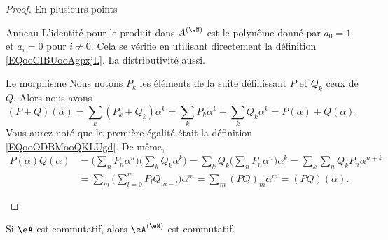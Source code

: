 \begin{proof}
    En plusieurs points
    \begin{subproof}
        \item[Anneau]
            L'identité pour le produit dans \( A^{(\eN)}\) est le polynôme donné par \( a_0=1\) et \( a_i=0\) pour \( i\neq 0\). Cela se vérifie en utilisant directement la définition \eqref{EQooCIBUooAgpxjL}. La distributivité aussi.
        \item[Le morphisme]
    Nous notons \( P_k\) les éléments de la suite définissant \( P\) et \( Q_k\) ceux de \( Q\). Alors nous avons
    \begin{equation}
        (P+Q)(\alpha)=\sum_k(P_k+Q_k)\alpha^k=\sum_kP_k\alpha^k+\sum_kQ_k\alpha^k=P(\alpha)+Q(\alpha).
    \end{equation}
    Vous aurez noté que la première égalité était la définition \eqref{EQooODBMooQKLUgd}. De même,
    \begin{subequations}
        \begin{align}
            P(\alpha)Q(\alpha)&=\big( \sum_nP_n\alpha^n \big)\big( \sum_kQ_k\alpha^k \big)=\sum_kQ_k\big( \sum_nP_n\alpha^n \big)\alpha^k=\sum_k\sum_nQ_kP_n\alpha^{n+k}\\
            &=\sum_m\big( \sum_{l=0}^mP_lQ_{m-l} \big)\alpha^m=\sum_m(PQ)_m\alpha^m=(PQ)(\alpha).
        \end{align}
    \end{subequations}
    \end{subproof}
\end{proof}

\begin{lemma}       \label{LEMooWVUXooQlaepO}
    Si \( \eA\) est commutatif, alors \( \eA^{(\eN)}\) est commutatif.
\end{lemma}

